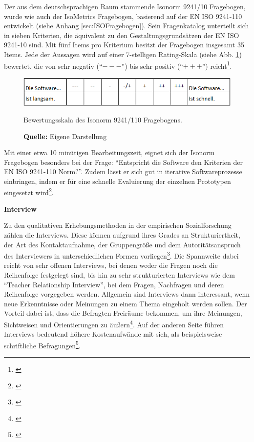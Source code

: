 Der aus dem deutschsprachigen Raum stammende Isonorm 9241/10 Fragebogen, wurde wie auch der IsoMetrics Fragebogen, basierend auf der EN ISO 9241-110 entwickelt (siehe Anhang \ref{sec:ISOFragebogen}). Sein Fragenkatalog unterteilt sich in sieben Kriterien, die äquivalent zu den Gestaltungsgrundsätzen der EN ISO 9241-10 sind. Mit fünf Items pro Kriterium besitzt der Fragebogen insgesamt 35 Items. Jede der Aussagen wird auf einer 7-stelligen Rating-Skala (siehe Abb. \ref{fig:IsonormBewertungsskala}) bewertet, die von sehr negativ (\enquote{$---$}) bis sehr positiv (\enquote{$+++$}) reicht\footnote{\cite[vgl.][Kap. 3.3]{Figl2010}}. 
\begin{figure}[H]
  \centering
  \includegraphics[scale=0.95]{img/Isonorm_Bewertungsskala.PNG}
  \caption{Bewertungsskala des Isonorm 9241/110 Fragebogens.}
  \caption*{\textbf{Quelle:} Eigene Darstellung}
  \label{fig:IsonormBewertungsskala}
\end{figure}
Mit einer etwa 10 minütigen Bearbeitungszeit, eignet sich der Isonorm Fragebogen besonders bei der Frage: \enquote{Entspricht die Software den Kriterien der EN ISO 9241-110 Norm?}. Zudem lässt er sich gut in iterative Softwareprozesse einbringen, indem er für eine schnelle Evaluierung der einzelnen Prototypen eingesetzt wird\footnote{\cite[vgl.][Kap. 3.3]{Figl2010}}.

\textbf{Interview}

Zu den qualitativen Erhebungsmethoden in der empirischen Sozialforschung zählen die Interviews. Diese können aufgrund ihres Grades an Strukturiertheit, der Art des Kontaktaufnahme, der Gruppengröße und dem Autoritätsanspruch des Interviewers in unterschiedlichen Formen vorliegen\footnote{\cite[vgl.][61]{Hegner2003}}. Die Spannweite dabei reicht von sehr offenen Interviews, bei denen weder die Fragen noch die Reihenfolge festgelegt sind, bis hin zu sehr strukturierten Interviews wie dem \enquote{Teacher Relationship Interview}, bei dem Fragen, Nachfragen und deren Reihenfolge vorgegeben werden. Allgemein sind Interviews dann interessant, wenn neue Erkenntnisse oder Meinungen zu einem Thema eingeholt werden sollen. Der Vorteil dabei ist, dass die Befragten Freiräume bekommen, um ihre Meinungen, Sichtweisen und Orientierungen zu äußern\footnote{\cite[vgl.][52\psqq]{Kelle2008}}. Auf der anderen Seite führen Interviews bedeutend höhere Kostenaufwände mit sich, als beispielsweise schriftliche Befragungen\footnote{\cite[vgl.][62\psq]{Hegner2003}}.


